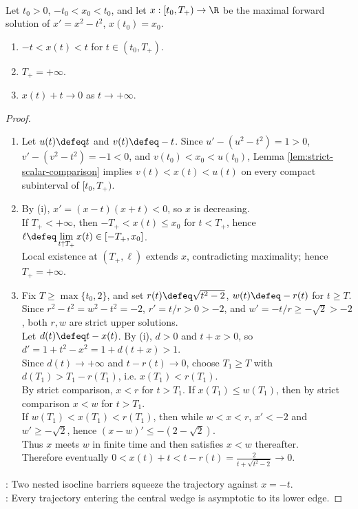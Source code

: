 \begin{proposition} \label{prop:riccati-central-wedge-asymptotics} \\
Let $t_0>0$, $-t_0<x_0<t_0$, and let $x:[t_0,T_+)\to\R$ be the maximal forward solution of $x'=x^2-t^2$, $x(t_0)=x_0$.
\begin{enumerate}[label=(\roman*)]
\setlength{\itemsep}{0pt}
\item $-t<x(t)<t$ for $t\in(t_0,T_+)$.
\item $T_+=+\infty$.
\item $x(t)+t\to0$ as $t\to+\infty$.
\end{enumerate}
\begin{proof}
\begin{enumerate}[label=(\roman*)]
\setlength{\itemsep}{0pt}
\item Let $u(t)\defeq t$ and $v(t)\defeq -t$. Since $u'-(u^2-t^2)=1>0$, $v'-(v^2-t^2)=-1<0$, and $v(t_0)<x_0<u(t_0)$, Lemma \ref{lem:strict-scalar-comparison} implies $v(t)<x(t)<u(t)$ on every compact subinterval of $[t_0,T_+)$.
\item By (i), $x'=(x-t)(x+t)<0$, so $x$ is decreasing.\\
If $T_+<+\infty$, then $-T_+<x(t)\leq x_0$ for $t<T_+$, hence $\ell\defeq\lim\limits_{t\uparrow T_+}x(t)\in[-T_+,x_0]$.\\
Local existence at $(T_+,\ell)$ extends $x$, contradicting maximality; hence $T_+=+\infty$.
\item Fix $T\geq\max\{t_0,2\}$, and set $r(t)\defeq\sqrt{t^2-2}$, $w(t)\defeq-r(t)$ for $t\geq T$. Since $r^2-t^2=w^2-t^2=-2$, $r'=t/r>0>-2$, and $w'=-t/r\geq-\sqrt2>-2$, both $r,w$ are strict upper solutions.\\
Let $d(t)\defeq t-x(t)$. By (i), $d>0$ and $t+x>0$, so $d'=1+t^2-x^2=1+d(t+x)>1$.\\
Since $d(t)\to+\infty$ and $t-r(t)\to0$, choose $T_1\geq T$ with $d(T_1)>T_1-r(T_1)$, i.e. $x(T_1)<r(T_1)$.\\
By strict comparison, $x<r$ for $t>T_1$. If $x(T_1)\leq w(T_1)$, then by strict comparison $x<w$ for $t>T_1$.\\
If $w(T_1)<x(T_1)<r(T_1)$, then while $w<x<r$, $x'<-2$ and $w'\geq-\sqrt2$, hence $(x-w)'\leq-(2-\sqrt2)$.\\
Thus $x$ meets $w$ in finite time and then satisfies $x<w$ thereafter.\\
Therefore eventually $0<x(t)+t<t-r(t)=\frac{2}{t+\sqrt{t^2-2}}\to0$.
\end{enumerate}
: Two nested isocline barriers squeeze the trajectory against $x=-t$.\\
: Every trajectory entering the central wedge is asymptotic to its lower edge.
\end{proof}
\end{proposition}

